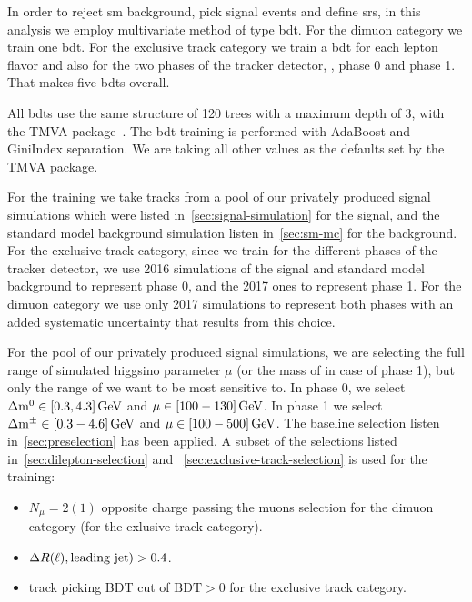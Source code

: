 In order to reject \gls{sm} background, pick signal events and define  \glspl{sr}, in this analysis we employ multivariate method of type \gls{bdt}. For the dimuon category we train one  \gls{bdt}. For the exclusive track category we train a \gls{bdt} for each lepton flavor and also for the two phases of the tracker detector, \ie, phase 0 and phase 1. That makes five \glspl{bdt} overall.

All \glspl{bdt} use the same structure of 120 trees with a maximum depth of 3, with the TMVA package~\cite{tmva}. The \gls{bdt} training is performed with AdaBoost and GiniIndex separation. We are taking all other values as the defaults set by the TMVA package. 

For the training we take tracks from a pool of our privately produced \FASTSIM signal simulations which were listed in~\ref{sec:signal-simulation} for the signal, and the standard model background simulation listen in~\ref{sec:sm-mc} for the background. For the exclusive track category, since we train for the different phases of the tracker detector, we use 2016 simulations of the signal and standard model background to represent phase 0, and the 2017 ones to represent phase 1. For the dimuon category we use only 2017 simulations to represent both phases with an added systematic uncertainty that results from this choice. 

For the pool of our privately produced \FASTSIM signal simulations, we are selecting the full range of simulated higgsino parameter $\mu$ (or the mass of \PSGcpmDo in case of phase 1), but only the range of \dm we want to be most sensitive to. In phase 0, we select $\Delta\mathrm{m}^0\in [0.3,4.3]\,\text{Ge\hspace{-.08em}V}$ and $\mu\in [100-130]\,\text{Ge\hspace{-.08em}V}$. In phase 1 we select $\Delta\mathrm{m}^\pm \in [0.3-4.6]\,\text{Ge\hspace{-.08em}V}$ and $\mu\in [100-500]\,\text{Ge\hspace{-.08em}V}$. The baseline selection listen in~\ref{sec:preselection} has been applied. A subset of the selections listed in~\ref{sec:dilepton-selection} and ~\ref{sec:exclusive-track-selection} is used for the training:

\begin{itemize}

\item $N_\mu = 2 (1)$ opposite charge passing the muons selection for the dimuon category (for the exlusive track category).

\item $\Delta R(\ell),\text{leading jet}) > 0.4$. 

\item track picking BDT cut of $\mathrm{BDT} > 0$ for the exclusive track category.

\end{itemize}

